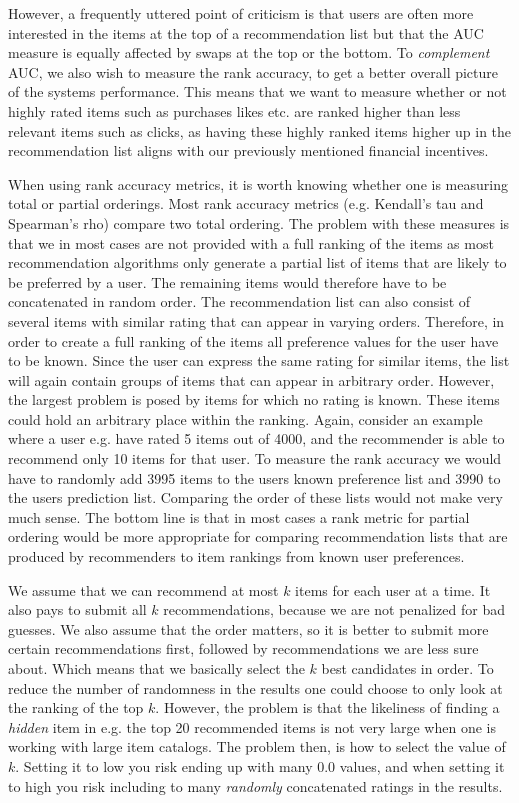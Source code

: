 However, a frequently uttered point of criticism is that users are often more interested in the items
at the top of a recommendation list but that the AUC measure is equally affected by swaps at the top
or the bottom. To \emph{complement} AUC, we also wish to measure the rank accuracy, to get a better
overall picture of the systems performance. This means that we want to measure whether or not
highly rated items such as purchases likes etc. are ranked higher than less relevant items such as clicks,
as having these highly ranked items higher up in the recommendation list aligns with our previously
mentioned financial incentives.


When using rank accuracy metrics, it is worth knowing whether one is measuring total or partial orderings.
Most rank accuracy metrics (e.g. Kendall's tau and Spearman's rho) compare two total ordering. The problem
with these measures is that we in most cases are not provided with a full ranking of the items as most recommendation
algorithms only generate a partial list of items that are likely to be preferred by a user. The remaining items
would therefore have to be concatenated in random order. The recommendation list can also consist of several
items with similar rating that can appear in varying orders. Therefore, in order to create a full ranking of
the items all preference values for the user have to be known. Since the user can express the same rating for similar
items, the list will again contain groups of items that can appear in arbitrary order. However, the largest problem
is posed by items for which no rating is known. These items could hold an arbitrary place within the ranking.
Again, consider an example where a user e.g. have rated 5 items out of 4000, and the recommender is able to recommend
only 10 items for that user. To measure the rank accuracy we would have to randomly add 3995 items to the users known
preference list and 3990 to the users prediction list. Comparing the order of these lists would not make very much sense. The bottom line is that in most cases a rank metric for partial ordering would be more appropriate for comparing recommendation lists that are produced by recommenders to item rankings from known user preferences.

We assume that we can recommend at most $k$ items for each user at a time. It also pays to submit all $k$
recommendations, because we are not penalized for bad guesses. We also assume that the order matters, so it
is better to submit more certain recommendations first, followed by recommendations we are less sure about.
Which means that we basically select the $k$ best candidates in order. To reduce the number of randomness in
the results one could choose to only look at the ranking of the top $k$. However, the problem is that the
likeliness of finding a \emph{hidden} item in e.g. the top 20 recommended items is not very large when one is working
with large item catalogs. The problem then, is how to select the value of $k$. Setting it to low you risk
ending up with many $0.0$ values, and when setting it to high you risk including to many \emph{randomly} concatenated 
ratings in the results.

